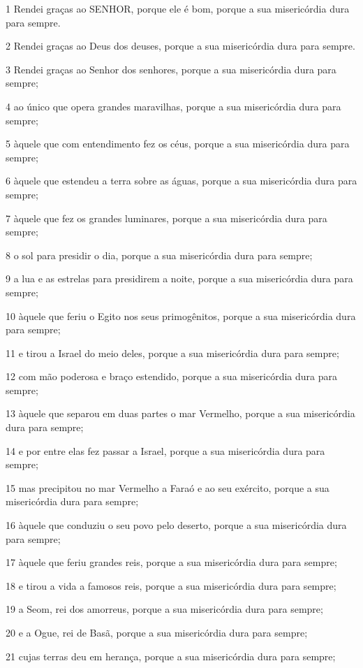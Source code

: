 \par 1 Rendei graças ao SENHOR, porque ele é bom, porque a sua misericórdia dura para sempre.
\par 2 Rendei graças ao Deus dos deuses, porque a sua misericórdia dura para sempre.
\par 3 Rendei graças ao Senhor dos senhores, porque a sua misericórdia dura para sempre;
\par 4 ao único que opera grandes maravilhas, porque a sua misericórdia dura para sempre;
\par 5 àquele que com entendimento fez os céus, porque a sua misericórdia dura para sempre;
\par 6 àquele que estendeu a terra sobre as águas, porque a sua misericórdia dura para sempre;
\par 7 àquele que fez os grandes luminares, porque a sua misericórdia dura para sempre;
\par 8 o sol para presidir o dia, porque a sua misericórdia dura para sempre;
\par 9 a lua e as estrelas para presidirem a noite, porque a sua misericórdia dura para sempre;
\par 10 àquele que feriu o Egito nos seus primogênitos, porque a sua misericórdia dura para sempre;
\par 11 e tirou a Israel do meio deles, porque a sua misericórdia dura para sempre;
\par 12 com mão poderosa e braço estendido, porque a sua misericórdia dura para sempre;
\par 13 àquele que separou em duas partes o mar Vermelho, porque a sua misericórdia dura para sempre;
\par 14 e por entre elas fez passar a Israel, porque a sua misericórdia dura para sempre;
\par 15 mas precipitou no mar Vermelho a Faraó e ao seu exército, porque a sua misericórdia dura para sempre;
\par 16 àquele que conduziu o seu povo pelo deserto, porque a sua misericórdia dura para sempre;
\par 17 àquele que feriu grandes reis, porque a sua misericórdia dura para sempre;
\par 18 e tirou a vida a famosos reis, porque a sua misericórdia dura para sempre;
\par 19 a Seom, rei dos amorreus, porque a sua misericórdia dura para sempre;
\par 20 e a Ogue, rei de Basã, porque a sua misericórdia dura para sempre;
\par 21 cujas terras deu em herança, porque a sua misericórdia dura para sempre;
